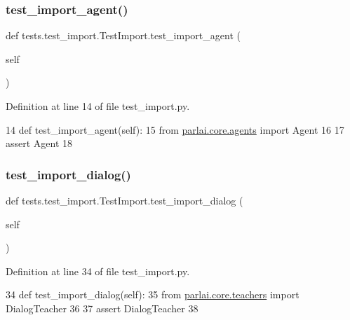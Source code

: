 \subsubsection{\texorpdfstring{test\+\_\+import\+\_\+agent()}{test\_import\_agent()}}
{\footnotesize\ttfamily def tests.\+test\+\_\+import.\+Test\+Import.\+test\+\_\+import\+\_\+agent (\begin{DoxyParamCaption}\item[{}]{self }\end{DoxyParamCaption})}



Definition at line 14 of file test\+\_\+import.\+py.


\begin{DoxyCode}
14     \textcolor{keyword}{def }test\_import\_agent(self):
15         \textcolor{keyword}{from} \hyperlink{namespaceparlai_1_1core_1_1agents}{parlai.core.agents} \textcolor{keyword}{import} Agent
16 
17         \textcolor{keyword}{assert} Agent
18 
\end{DoxyCode}
\mbox{\label{classtests_1_1test__import_1_1TestImport_a5dcc13dee044ad4be07523f024b13db2}} 
\subsubsection{\texorpdfstring{test\+\_\+import\+\_\+dialog()}{test\_import\_dialog()}}
{\footnotesize\ttfamily def tests.\+test\+\_\+import.\+Test\+Import.\+test\+\_\+import\+\_\+dialog (\begin{DoxyParamCaption}\item[{}]{self }\end{DoxyParamCaption})}



Definition at line 34 of file test\+\_\+import.\+py.


\begin{DoxyCode}
34     \textcolor{keyword}{def }test\_import\_dialog(self):
35         \textcolor{keyword}{from} \hyperlink{namespaceparlai_1_1core_1_1teachers}{parlai.core.teachers} \textcolor{keyword}{import} DialogTeacher
36 
37         \textcolor{keyword}{assert} DialogTeacher
38 
\end{DoxyCode}
\mbox{\label{classtests_1_1test__import_1_1TestImport_ad030b185d0f0b02e1d8606d578d48820}} 
